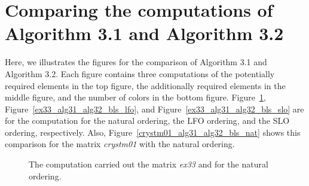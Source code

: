 \documentclass[12pt, twoside,a4paper,toc=bibliography]{scrbook}
\newcommand{\figref}[1]{Figure~\protect\ref{#1}}
\begin{document}
\section{Comparing the computations of Algorithm 3.1 and Algorithm 3.2}
\label{app.compare.alg31.alg32}
Here, we illustrates the figures for the comparison of Algorithm 3.1 and Algorithm 3.2.
Each figure contains three computations of the potentially required elements in the top figure,
the additionally required elements in the middle figure, and the number of colors in the bottom figure.
\figref{ex33_alg31_alg32_bls_nat}, \figref{ex33_alg31_alg32_bls_lfo},
and \figref{ex33_alg31_alg32_bls_slo} are for the computation for the natural ordering,
the LFO ordering, and the SLO ordering, respectively.
Also, \figref{crystm01_alg31_alg32_bls_nat} shows this comparison for the matrix \textit{crystm01}
with the natural ordering.
\begin{figure}
\caption{The computation carried out the matrix \textit{ex33} and for the natural ordering.}
\label{ex33_alg31_alg32_bls_nat}
\end{figure}
\end{document}
